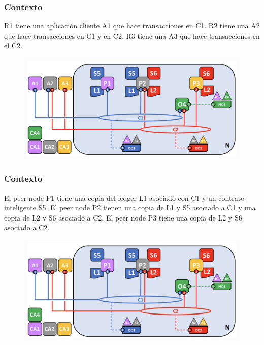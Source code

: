\documentclass{beamer}
\begin{document}
	\begin{frame}
		\frametitle{Contexto}
		R1 tiene una aplicación cliente A1 que hace transacciones en C1. R2 tiene una A2 que hace transacciones en C1 y en C2. R3 tiene una A3 que hace transacciones en el C2.
		\begin{figure}[h]
			\includegraphics[scale=.3]{start_01}
			\centering
		\end{figure}
	\end{frame}
	
	\begin{frame}
		\frametitle{Contexto}
		El peer node P1 tiene una copia del ledger L1 asociado con C1 y un contrato inteligente S5. El peer node P2 tienen una copia de L1 y S5 asociado a C1 y una copia de L2 y S6 asociado a C2. El peer node P3 tiene una copia de L2 y S6 asociado a C2.
		\begin{figure}[h]
			\includegraphics[scale=.3]{start_01}
			\centering
		\end{figure}
	\end{frame}
	
\end{document}
